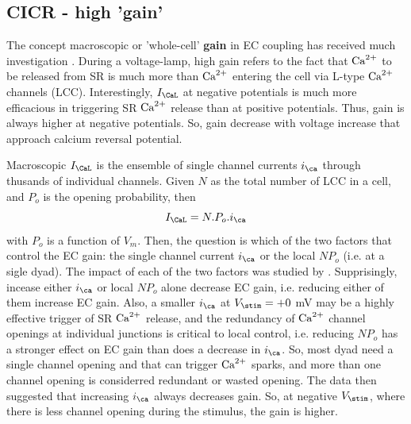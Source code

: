 \subsection{CICR - high 'gain'}

The concept macroscopic or 'whole-cell' {\bf gain} in EC coupling has received
much investigation \citep{wier2007a}. During a voltage-lamp, high gain refers to
the fact that ${\text{Ca}^{2+}}$ to be released from SR is much more than ${\text{Ca}^{2+}}$ entering the
cell via L-type ${\text{Ca}^{2+}}$ channels (LCC). Interestingly, $I_\CaL$ at negative
potentials is much more efficacious in triggering SR ${\text{Ca}^{2+}}$ release than at
positive potentials.
Thus, gain is always higher at negative potentials. So, gain decrease with
voltage increase that approach calcium reversal potential.

Macroscopic $I_\CaL$ is the ensemble of single channel currents $i_\ca$ through
thusands of individual channels. Given $N$ as the total number of LCC in a cell,
and $P_o$ is the opening probability, then
\begin{equation}
I_\CaL = N.P_o.i_\ca
\end{equation}
with $P_o$ is a function of $V_m$. Then, the question is which of the 
two factors that control the EC gain: the single channel current $i_\ca$ or
the local $NP_o$ (i.e. at a sigle dyad). The impact of each of the two factors was studied
by \citep{altamirano2007}. Supprisingly, incease either $i_\ca$ or local $NP_o$
alone decrease EC gain, i.e. reducing either of them increase EC gain. Also, a
smaller $i_\ca$ at $V_\stim=+0$ mV may be a highly effective trigger of SR ${\text{Ca}^{2+}}$
release, and the redundancy of ${\text{Ca}^{2+}}$  channel openings at individual junctions
is critical to local control, i.e. reducing $NP_o$ has a stronger effect on EC
gain than does a decrease in $i_\ca$. So, most dyad need a single channel
opening and that can trigger ${\text{Ca}^{2+}}$ sparks, and more than one channel opening is
considerred redundant or wasted opening. The data then suggested that increasing
$i_\ca$ always decreases gain. So, at negative $V_\stim$, where there is less
channel opening during the stimulus, the gain is higher. 


